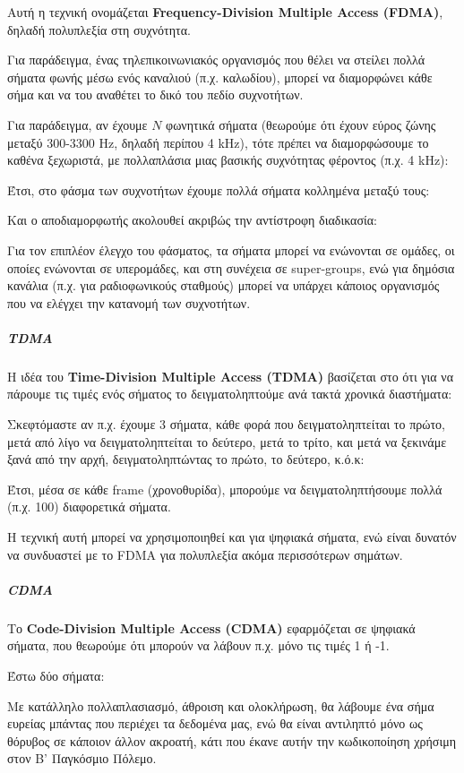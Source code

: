 \documentclass[11pt,a4paper,notitlepage,fleqn]{article}
\begin{document}
Αυτή η τεχνική ονομάζεται \textbf{Frequency-Division Multiple Access (FDMA)}, δηλαδή
πολυπλεξία στη συχνότητα.

Για παράδειγμα, ένας τηλεπικοινωνιακός οργανισμός που θέλει να στείλει πολλά σήματα 
φωνής μέσω ενός καναλιού (π.χ. καλωδίου), μπορεί να διαμορφώνει κάθε σήμα και να του
αναθέτει το δικό του πεδίο συχνοτήτων.

Για παράδειγμα, αν έχουμε \( N \) φωνητικά σήματα (θεωρούμε ότι έχουν εύρος ζώνης
μεταξύ 300-3300 Hz, δηλαδή περίπου 4 kHz), τότε πρέπει να διαμορφώσουμε το καθένα
ξεχωριστά, με πολλαπλάσια μιας βασικής συχνότητας φέροντος (π.χ. 4 kHz):

Έτσι, στο φάσμα των συχνοτήτων έχουμε πολλά σήματα κολλημένα μεταξύ τους:

Και ο αποδιαμορφωτής ακολουθεί ακριβώς την αντίστροφη διαδικασία:

Για τον επιπλέον έλεγχο του φάσματος, τα σήματα μπορεί να ενώνονται σε ομάδες, οι οποίες
ενώνονται σε υπερομάδες, και στη συνέχεια σε super-groups, ενώ για δημόσια κανάλια
(π.χ. για ραδιοφωνικούς σταθμούς) μπορεί να υπάρχει κάποιος οργανισμός που να ελέγχει την
κατανομή των συχνοτήτων.

\subparagraph{TDMA}
Η ιδέα του \textbf{Time-Division Multiple Access (TDMA)} βασίζεται στο ότι για να πάρουμε
τις τιμές ενός σήματος το δειγματοληπτούμε ανά τακτά χρονικά διαστήματα:

Σκεφτόμαστε αν π.χ. έχουμε 3 σήματα, κάθε φορά που δειγματοληπτείται το πρώτο, μετά από
λίγο να δειγματοληπτείται το δεύτερο, μετά το τρίτο, και μετά να ξεκινάμε ξανά από την
αρχή, δειγματοληπτώντας το πρώτο, το δεύτερο, κ.ό.κ:

Έτσι, μέσα σε κάθε frame (χρονοθυρίδα),
μπορούμε να δειγματοληπτήσουμε πολλά (π.χ. 100) διαφορετικά σήματα.

Η τεχνική αυτή μπορεί να χρησιμοποιηθεί και για ψηφιακά σήματα, ενώ είναι δυνατόν να
συνδυαστεί με το FDMA για πολυπλεξία ακόμα περισσότερων σημάτων.

\subparagraph{CDMA}
Το \textbf{Code-Division Multiple Access (CDMA)} εφαρμόζεται σε ψηφιακά σήματα, που θεωρούμε
ότι μπορούν να λάβουν π.χ. μόνο τις τιμές 1 ή -1.

Έστω δύο σήματα:

Με κατάλληλο πολλαπλασιασμό, άθροιση και ολοκλήρωση, θα λάβουμε ένα σήμα ευρείας μπάντας
που περιέχει τα δεδομένα μας, ενώ θα είναι αντιληπτό μόνο ως θόρυβος σε κάποιον άλλον ακροατή,
κάτι που έκανε αυτήν την κωδικοποίηση χρήσιμη στον Β' Παγκόσμιο Πόλεμο.
\end{document}
